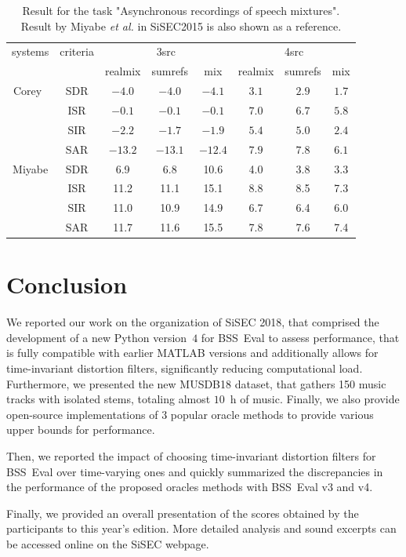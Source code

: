 \documentclass{article}
\begin{document}
\begin{table}
\centering
\caption{Result for the task "Asynchronous recordings of speech mixtures". Result by Miyabe {\it et al.} in SiSEC2015 is also shown as a reference.}
\label{table}
\begin{tabular}{|c|c|ccc|ccc|}\hline
systems&criteria&\multicolumn{3}{|c|}{3src}&\multicolumn{3}{|c|}{4src}\\
&&realmix&sumrefs&mix&realmix&sumrefs&mix\\\hline
Corey~\cite{corey}&SDR&$-4.0$&$-4.0$&$-4.1$&$3.1$&$2.9$&$1.7$\\
&ISR&$-0.1$&$-0.1$&$-0.1$&$7.0$&$6.7$&$5.8$\\
&SIR&$-2.2$&$-1.7$&$-1.9$&$5.4$&$5.0$&$2.4$\\
&SAR&$-13.2$&$-13.1$&$-12.4$&$7.9$&$7.8$&$6.1$\\\hline
Miyabe&SDR&6.9&6.8&10.6&4.0&3.8&3.3\\
&ISR&11.2&11.1&15.1&8.8&8.5&7.3\\
&SIR&11.0&10.9&14.9&6.7&6.4&6.0\\
&SAR&11.7&11.6&15.5&7.8&7.6&7.4\\\hline
\end{tabular}
\end{table}

\section{Conclusion}
\label{sec:concl}
\vspace{-2mm}
We reported our work on the organization of SiSEC 2018, that comprised the development of a new Python version~$4$ for BSS~Eval to assess performance, that is fully compatible with earlier MATLAB versions and additionally allows for time-invariant distortion filters, significantly reducing computational load. Furthermore, we presented the new MUSDB18 dataset, that gathers 150 music tracks with isolated stems, totaling almost $10$~h of music. Finally, we also provide open-source implementations of $3$ popular oracle methods to provide various upper bounds for performance.

Then, we reported the impact of choosing time-invariant distortion filters for BSS~Eval over time-varying ones and quickly summarized the discrepancies in the performance of the proposed oracles methods with BSS~Eval v3 and v4.

Finally, we provided an overall presentation of the scores obtained by the participants to this year's edition. More detailed analysis and sound excerpts can be accessed online on the SiSEC webpage.
\footnotesize


\end{document}
